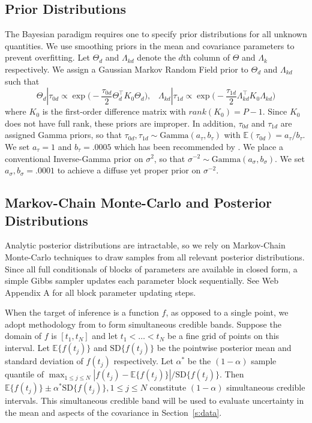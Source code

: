 \documentclass[useAMS,usenatbib]{biom}
\begin{document}
\subsection{Prior Distributions}
\label{s:priors}
The Bayesian paradigm requires one to specify prior distributions for all unknown quantities. We use smoothing priors in the mean and covariance parameters to prevent overfitting. Let $\Theta_{d}$ and $\Lambda_{kd}$ denote the $d$th column of $\Theta$ and $\Lambda_{k}$ respectively. We assign a Gaussian Markov Random Field prior to $\Theta_{d}$ and $\Lambda_{kd}$ such that
\begin{equation*}
\Theta_{d}|\tau_{0d} \propto \exp\bigg(-\frac{\tau_{0d}}{2}\Theta_{d}^{\top}K_{0}\Theta_{d}\bigg),\;\;\;\Lambda_{kd}|\tau_{1d}\propto\exp\bigg(-\frac{\tau_{1d}}{2}\Lambda_{kd}^{\top}K_{0}\Lambda_{kd}\bigg)
\end{equation*}
where $K_{0}$ is the first-order difference matrix with $rank(K_{0}) = P-1$. Since $K_{0}$ does not have full rank, these priors are improper. In addition, $\tau_{0d}$ and $\tau_{1d}$ are assigned Gamma priors, so that $\tau_{0d},\tau_{1d}\sim \text{Gamma}(a_{\tau}, b_{\tau})$ with $\mathbb{E}(\tau_{0d}) = a_{\tau}/b_{\tau}$. We set $a_{\tau} = 1$ and $b_{\tau} =.0005$ which has been recommended by \citet{Lang2004}. We place a conventional Inverse-Gamma prior on $\sigma^{2}$, so that $\sigma^{-2} \sim \text{Gamma}(a_{\sigma}, b_{\sigma})$. We set $a_{\sigma},b_{\sigma} = .0001$ to achieve a diffuse yet proper prior on $\sigma^{-2}$.

\subsection{Markov-Chain Monte-Carlo and Posterior Distributions}
\label{s:posteriors}
Analytic posterior distributions are intractable, so we rely on Markov-Chain Monte-Carlo techniques to draw samples from all relevant posterior distributions. Since all full conditionals of blocks of parameters are available in closed form, a simple Gibbs sampler updates each parameter block sequentially. See Web Appendix A for all block parameter updating steps.

When the target of inference is a function $f$, as opposed to a single point, we adopt methodology from \citet{Crainiceanu2007} to form simultaneous credible bands. Suppose the domain of $f$ is $[t_{1}, t_{N}]$ and let $t_{1} < \ldots < t_{N}$ be a fine grid of points on this interval. Let $\mathbb{E}\{f(t_{j})\}$ and $\text{SD}\{f(t_{j})\}$ be the pointwise posterior mean and standard deviation of $f(t_{j})$ respectively. Let $\alpha^{*}$ be the $(1-\alpha)$ sample quantile of $\max_{1\leq j \leq N} |f(t_{j}) - \mathbb{E}\{f(t_{j})\}|/\text{SD}\{f(t_{j})\}$. Then $\mathbb{E}\{f(t_{j})\} \pm \alpha^{*} \text{SD}\{f(t_{j})\}, 1\leq j\leq N$ constitute $(1-\alpha)$ simultaneous credible intervals. This simultaneous credible band will be used to evaluate uncertainty in the mean and aspects of the covariance in Section~\ref{s:data}.
\end{document}

